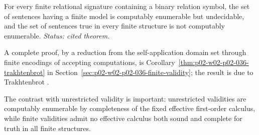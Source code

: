 \begin{theorem}[Trakhtenbrot]
For every finite relational signature containing a binary relation symbol, the
set of sentences having a finite model is computably enumerable but
undecidable, and the set of sentences true in every finite structure is not
computably enumerable.
\textit{Status: cited theorem.}
\end{theorem}

A complete proof, by a reduction from the self-application domain set through
finite encodings of accepting computations, is
Corollary~\ref{thm:p02-w02-p02-036-trakhtenbrot} in
Section~\ref{sec:p02-w02-p02-036-finite-validity}; the result is due to
Trakhtenbrot \cite{Trakhtenbrot1950}.

The contrast with unrestricted validity is important: unrestricted
validities are computably enumerable by completeness of the fixed effective
first-order calculus, while finite validities admit no effective calculus
both sound and complete for truth in all finite
structures.

